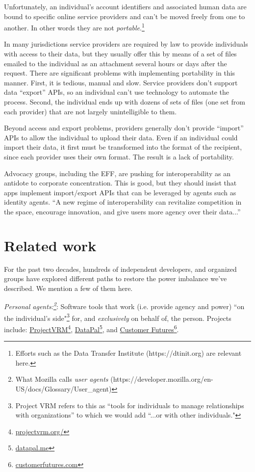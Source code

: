 \documentclass[11pt, oneside]{article}   	%
\newcommand{\hyperfootnote}[1][]{\def\ArgI{{#1}}\hyperfootnoteRelay}
\newcommand\hyperfootnoteRelay[2][]{\href{#1#2}{\ArgI}\footnote{\href{#1#2}{#2}}}
\begin{document}
Unfortunately, an individual's account identifiers and associated human data are bound to specific online service providers and can't be moved freely from one to another. In other words they are not \emph{portable}.\footnote{Efforts such as the Data Transfer Institute (https://dtinit.org) are relevant here.}

In many jurisdictions service providers are required by law to provide individuals with access to their data, but they usually offer this by means of a set of files emailed to the individual as an attachment several hours or days after the request. There are significant problems with implementing portability in this manner. First, it is tedious, manual and slow. Service providers don't support data ``export'' APIs, so an individual can't use technology to automate the process. Second, the individual ends up with dozens of sets of files (one set from each provider) that are not largely unintelligible to them. 

Beyond access and export problems, providers generally don't provide ``import'' APIs to allow the individual to upload their data. Even if an individual could import their data, it first must be transformed into the format of the recipient, since each provider uses their own format. The result is a lack of portability.

Advocacy groups, including the EFF, are pushing for interoperability as an antidote to corporate concentration. This is good, but they should insist that apps implement import/export APIs that can be leveraged by agents such as identity agents. ``A new regime of interoperability can revitalize competition in the space, encourage innovation, and give users more agency over their data...''\cite{Cyphers2021} 

\section{Related work} %

For the past two decades, hundreds of independent developers, and organized groups have explored different paths to restore the power imbalance we've described. We mention a few of them here.

\emph{Personal agents:\footnote{What Mozilla calls \emph{user agents} (https://developer.mozilla.org/en-US/docs/Glossary/User\_agent)}}: Software tools that work (i.e. provide agency and power) ``on the individual's side"\footnote{Project VRM\cite{Searls2019} refers to this as ``tools for individuals to manage relationships with organizations'' to which we would add ``...or with other individuals."} for, and \emph{exclusively} on behalf of, the person. Projects include: \hyperfootnote[ProjectVRM][https://]{projectvrm.org/}, \hyperfootnote[DataPal][https://]{datapal.me}, and \hyperfootnote[Customer Futures][https://]{customerfutures.com}.
\end{document}
